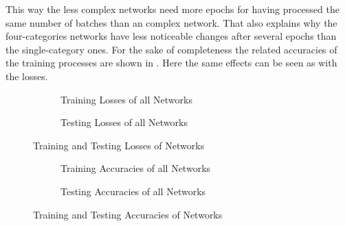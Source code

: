 This way the less complex networks need more epochs for having processed the same number of batches than an complex network.
That also explains why the four-categories networks have less noticeable changes after several epochs than the single-category ones.
For the sake of completeness the related accuracies of the training processes are shown in .
Here the same effects can be seen as with the losses.
\begin{figure}
	\setlength{}
	\setlength{}
	\centering
	\begin{subfigure}{\textwidth}
		\centering
		
		\caption{Training Losses of all Networks}
		\label{fig:train-loss}
	\end{subfigure}
	\begin{subfigure}{\textwidth}
		\centering
		
		\caption{Testing Losses of all Networks}
		\label{fig:test-loss}
	\end{subfigure}
	\caption{Training and Testing Losses of Networks}
	\label{fig:networks-loss}
\end{figure}
\begin{figure}
	\setlength{}
	\setlength{}
	\centering
	\begin{subfigure}{\textwidth}
		\centering
		
		\caption{Training Accuracies of all Networks}
		\label{fig:train-accuracy}
	\end{subfigure}
	\begin{subfigure}{\textwidth}
		\centering
		
		\caption{Testing Accuracies of all Networks}
		\label{fig:test-accuracy}
	\end{subfigure}
	\caption{Training and Testing Accuracies of Networks}
	\label{fig:networks-accuracy}
\end{figure}